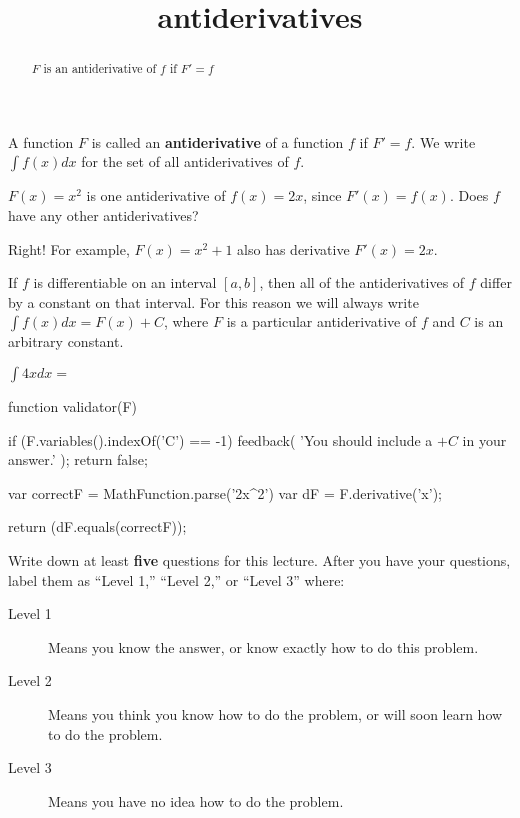 \documentclass{ximera}
\title{antiderivatives}
\begin{document}
\begin{abstract}
  $F$ is an antiderivative of $f$ if $F'=f$
\end{abstract}

\maketitle

\begin{definition}
	A function $F$ is called an \textbf{antiderivative} of a function $f$ if $F' = f$.  We write $\int f(x) dx$ for the set of all antiderivatives of $f$.
\end{definition}

\begin{question}
	$F(x) = x^2$ is one antiderivative of $f(x) = 2x$, since $F'(x) = f(x)$.  Does $f$ have any other antiderivatives?
\begin{solution}
	 \begin{multipleChoice}
    	\end{multipleChoice}  
  \end{solution}
  
  Right!  For example, $F(x) = x^2+1$ also has derivative $F'(x) = 2x$.
\end{question}

\begin{theorem}
	If $f$ is differentiable on an interval $[a,b]$, then all of the antiderivatives of $f$ differ by a constant on that interval.  For this reason we will always write $\int f(x) dx  = F(x)+C$, where $F$ is a particular antiderivative of $f$ and $C$ is an arbitrary constant.
\end{theorem}

\begin{question}
 	$\int 4x dx = $ 
	\begin{expression-answer}
 function validator(F) {
   if (F.variables().indexOf('C') == -1) {
     feedback( 'You should include a $+C$ in your answer.' );
     return false;
   }
   
   var correctF = MathFunction.parse('2x^2')
   var dF = F.derivative('x');
   
   return (dF.equals(correctF));
 }
\end{expression-answer}	
	
\end{question}

\begin{question}
Write down at least \textbf{five} questions for this lecture. After
you have your questions, label them as ``Level 1,'' ``Level 2,'' or ``Level 3'' where:
\begin{description}
\item[Level 1] Means you know the answer, or know exactly how to do this problem.
\item[Level 2] Means you think you know how to do the problem, or will soon learn how to do the problem.
\item[Level 3] Means you have no idea how to do the problem. 
\end{description}
\begin{freeResponse}
\end{freeResponse}
\end{question}
\end{document}
